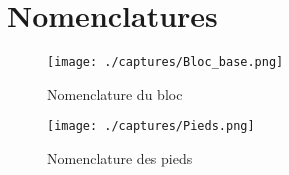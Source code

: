 \section{Nomenclatures}

	\begin{figure}[H]
\centering
\texttt{[image: ./captures/Bloc\_base.png]}
\caption{Nomenclature du bloc}
	\end{figure}	
	
		\begin{figure}[H]
\centering
\texttt{[image: ./captures/Pieds.png]}
\caption{Nomenclature des pieds}
	\end{figure}	
